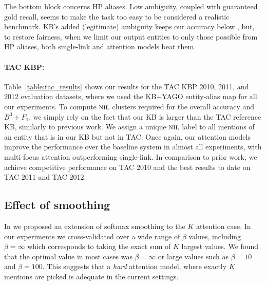 The bottom block concerns HP aliases.  Low ambiguity, coupled with
guaranteed gold recall, seems to make the task too easy to be
considered a realistic benchmark.  KB's added (legitimate) ambiguity
keeps our accuracy below , but, to restore
fairness, when we limit our output entities to only those possible
from HP aliases, both single-link and attention models beat them.


\paragraph*{TAC KBP:}
Table~\ref{table:tac_results} shows our results for the TAC KBP 2010, 2011, and 2012
evaluation datasets, where we used the KB+YAGO entity-alias map for all our experiments. 
To compute $\mbox{\textsc{nil}}$ clusters required for the overall accuracy
and $B^3+F_1$, we simply rely on the fact that our KB is larger than the TAC
reference KB, similarly to previous work. We assign a unique $\mbox{\textsc{nil}}$ label to
all mentions of an entity that is in our KB but not in TAC. 
Once again, our attention models improve the performance over the baseline
system in almost all experiments, with multi-focus attention outperforming single-link. In comparison to
prior work, we achieve competitive performance on TAC 2010 and the best
results to date on TAC 2011 and TAC 2012.





\subsection{Effect of smoothing}
In  we proposed an extension of softmax smoothing to the $K$ attention case. In our experiments 
we cross-validated over a wide range of $\beta$ values, including $\beta=\infty$ which corresponds to taking
the exact sum of $K$ largest values. We found that the optimal value in most cases was  $\beta=\infty$ or large values
such as $\beta=10$ and $\beta=100$. This suggests that a {\em hard} attention model, where exactly $K$ mentions are picked is adequate in the current settings.



